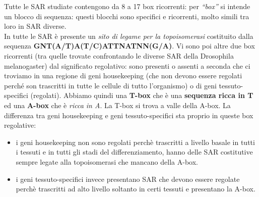 \documentclass[11pt]{book}
\begin{document}
Tutte le SAR studiate contengono da 8 a 17 box ricorrenti: per \emph{``box''} si intende un blocco di sequenza: questi blocchi sono specifici e ricorrenti, molto simili tra loro in SAR diverse.\\
In tutte le SAR è presente un \emph{sito di legame per la topoisomerasi} costituito dalla sequenza \textbf{GNT(A/T)A(T/C)ATTNATNN(G/A)}. 
Vi sono poi altre due box ricorrenti (tra quelle trovate confrontando le diverse SAR della Drosophila melanogaster) dal significato regolativo: sono presenti o assenti a seconda che ci troviamo in una regione di geni housekeeping (che non devono essere regolati perché son trascritti in tutte le cellule di tutto l’organismo) o di geni tessuto-specifici (regolati). Abbiamo quindi una \textbf{T-box} che è una \textbf{sequenza ricca in T} ed una \textbf{A-box} che è \emph{ricca in A}. La T-box si trova a valle della A-box. La differenza tra geni housekeeping e geni  tessuto-specifici sta proprio in queste box regolative:
\begin{itemize}
\item i geni housekeeping non sono regolati perchè trascritti a livello basale in tutti i tessuti e in tutti gli stadi del differenziamento, hanno delle SAR costitutive sempre legate alla topoisomerasi che mancano della A-box.
\item i geni tessuto-specifici invece presentano SAR che devono essere regolate perchè trascritti ad alto livello soltanto in certi tessuti e presentano la A-box.
\end{itemize}
\end{document}
